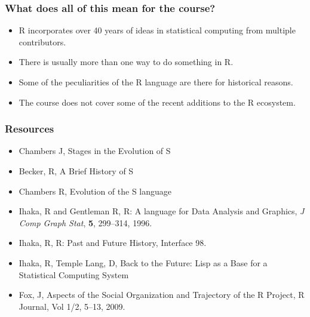\documentclass[svgnames]{beamer}
\begin{document}
%
%
%    
%
%    
%  

\begin{frame}
  \frametitle{What does all of this mean for the course?}

  \begin{itemize}
  \item R incorporates over 40 years of ideas in statistical computing
    from multiple contributors.
  \item There is usually more than one way to do something in R.
  \item Some of the peculiarities of the R language are there for
    historical reasons.
  \item The course does not cover some of the recent additions to the
    R ecosystem.
  \end{itemize}

\end{frame}
    
\begin{frame}
  \frametitle{Resources}

  \begin{itemize}
  \item Chambers J, Stages in the Evolution of S
  \item Becker, R, A Brief History of S
  \item Chambers R, Evolution of the S language
  \item Ihaka, R and Gentleman R, R: A language for Data Analysis and Graphics,
    {\em J Comp Graph Stat}, {\bf 5}, 299--314, 1996.
  \item Ihaka, R, R: Past and Future History, Interface 98.
  \item Ihaka, R, Temple Lang, D, Back to the Future: Lisp as a Base for a
    Statistical Computing System
  \item Fox, J, Aspects of the Social Organization and Trajectory of
    the R Project, R Journal, Vol 1/2, 5--13, 2009.
  \end{itemize}

\end{frame}
\end{document}
